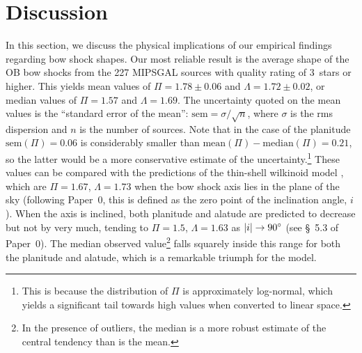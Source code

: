 
\section{Discussion}
\label{sec:discussion}

In this section, we discuss the physical implications of our empirical
findings regarding bow shock shapes.  Our most reliable result is the
average shape of the OB bow shocks from the 227 MIPSGAL sources with
quality rating of 3~stars or higher.  This yields mean values of
\(\Pi = 1.78 \pm 0.06\) and \(\Lambda = 1.72 \pm 0.02\), or median values of
\(\Pi = 1.57\) and \(\Lambda = 1.69\).  The uncertainty quoted on the mean
values is the ``standard error of the mean'':
\(\text{sem} = \sigma / \sqrt{n}\), where \(\sigma\) is the rms dispersion and
\(n\) is the number of sources.  Note that in the case of the
planitude \(\text{sem}(\Pi) = 0.06\) is considerably smaller than
\(\text{mean}(\Pi) - \text{median}(\Pi) = 0.21\), so the latter would be a
more conservative estimate of the uncertainty.\footnote{This is
  because the distribution of \(\Pi\) is approximately log-normal, which
  yields a significant tail towards high values when converted to
  linear space.}  These values can be compared with the predictions of
the thin-shell wilkinoid model \citep{Wilkin:1996a}, which are
\(\Pi = 1.67\), \(\Lambda = 1.73\) when the bow shock axis lies in the plane
of the sky (following Paper~0, this is defined as the zero point of
the inclination angle, \(i\)).  When the axis is inclined, both
planitude and alatude are predicted to decrease but not by very much,
tending to \(\Pi = 1.5\), \(\Lambda = 1.63\) as
\(\lvert i\rvert \to \ang{90}\) (see \S~5.3 of Paper~0).  The median observed
value\footnote{In the presence of outliers, the median is a more
  robust estimate of the central tendency than is the mean.} falls
squarely inside this range for both the planitude and alatude, which
is a remarkable triumph for the \citet{Wilkin:1996a} model.

